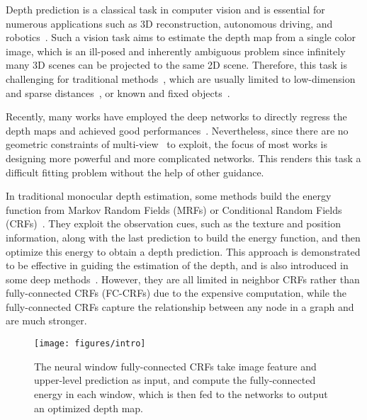 \documentclass[10pt,twocolumn,letterpaper]{article}
\begin{document}
Depth prediction is a classical task in computer vision and is essential for numerous applications such as 3D reconstruction, autonomous driving, and robotics~\cite{izadi2011kinectfusion, geiger2012we, yuan2019reinforcement, yuan2019end}.
Such a vision task aims to estimate the depth map from a single color image, which is an ill-posed and inherently ambiguous problem since infinitely many 3D scenes can be projected to the same 2D scene.
Therefore, this task is challenging for traditional methods~\cite{michels2005high, nagai2002hmm, saxena2005learning}, which are usually limited to low-dimension and sparse distances~\cite{michels2005high}, or known and fixed objects~\cite{nagai2002hmm}.


Recently, many works have employed the deep networks to directly regress the depth maps and achieved good performances~\cite{eigen2014depth, lee2019big, aich2020bidirectional, lee2021patch, fu2018deep, bhat2021adabins}. 
Nevertheless, since there are no geometric constraints of multi-view~\cite{gu2021dro,yuan2020mfusenet,yuan2021stereo} to exploit, the focus of most works is designing more powerful and more complicated networks.
This renders this task a difficult fitting problem without the help of other guidance.







In traditional monocular depth estimation, some methods build the energy function from Markov Random Fields (MRFs) or Conditional Random Fields (CRFs)~\cite{saxena2005learning, saxena2008make3d, wang2015depth}. 
They exploit the observation cues, such as the texture and position information, along with the last prediction to build the energy function, and then optimize this energy to obtain a depth prediction.
This approach is demonstrated to be effective in guiding the estimation of the depth, and is also introduced in some deep methods~\cite{liu2015deep, hua2016depth, ricci2018monocular, xu2018structured}.
However, they are all limited in neighbor CRFs rather than fully-connected CRFs (FC-CRFs) due to the expensive computation, while the fully-connected CRFs capture the relationship between any node in a graph and are much stronger.



\begin{figure}[t]
\centering
  \texttt{[image: figures/intro]}
\caption{The neural window fully-connected CRFs take image feature  and upper-level prediction  as input, and compute the fully-connected energy  in each window, which is then fed to the networks to output an optimized depth map.
}
\label{fig:intro}
\end{figure}
\end{document}
